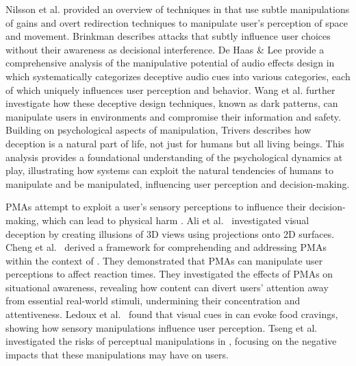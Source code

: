 Nilsson et al. \cite{nilsson201815} provided an overview of \RDW techniques in \VR that use subtle manipulations of gains and overt redirection techniques to manipulate user's perception of space and movement. Brinkman \cite{Brinkman} describes attacks that subtly influence user choices without their awareness as decisional interference.
De Haas \& Lee \cite{deHaas2022audio} provide a comprehensive analysis of the manipulative potential of audio effects design in \AR which systematically categorizes deceptive audio cues into various categories, each of which uniquely influences user perception and behavior.
Wang et al. \cite{wang2023dark} further investigate how these deceptive design techniques, known as dark patterns, can manipulate users in \AR environments and compromise their information and safety.
Building on psychological aspects of manipulation, Trivers \cite{Trivers2011Deceit} describes how deception is a natural part of life, not just for humans but all living beings.
This analysis provides a foundational understanding of the psychological dynamics at play, illustrating how \MR systems can exploit the natural tendencies of humans to manipulate and be manipulated, influencing user perception and decision-making.

\acp{PMA} attempt to exploit a user's sensory perceptions to influence their decision-making, which can lead to physical harm \cite{Tseng_2022, cheng2023exploring}.
Ali et al.~\cite{Ali_Mahmood_Qadri_2018} investigated visual deception by creating illusions of 3D views using projections onto 2D surfaces.
Cheng et al.~\cite{cheng2023exploring} derived a framework for comprehending and addressing \acp{PMA} within the context of \MR. 
They demonstrated that \acp{PMA} can manipulate user perceptions to affect reaction times. 
They investigated the effects of \acp{PMA} on situational awareness, revealing how \MR content can divert users' attention away from essential real-world stimuli, undermining their concentration and attentiveness. 
Ledoux et al.~\cite{ledoux2013using} found that visual cues in \VR can evoke food cravings, showing how sensory manipulations influence user perception. %
Tseng et al.~\cite{Tseng_2022} investigated the risks of perceptual manipulations in \VR, focusing on the negative impacts that these manipulations may have on users.

